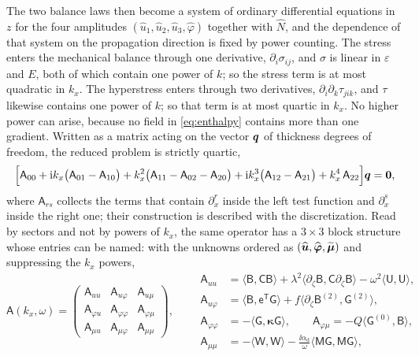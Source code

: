 The two balance laws then become a system of ordinary differential equations in
$z$ for the four amplitudes $(\widehat u_1,\widehat u_2,\widehat u_3,
\widehat\varphi)$ together with $\widehat N$, and the dependence of that system
on the propagation direction is fixed by power counting.  The stress enters the
mechanical balance through one derivative, $\partial_i\sigma_{ij}$, and $\sigma$
is linear in $\varepsilon$ and $E$, both of which contain one power of $k$; so the stress term is at most quadratic in $k_x$.  The hyperstress enters
through two derivatives, $\partial_i\partial_k\tau_{jik}$, and $\tau$ likewise
contains one power of $k$; so that term is at most quartic in $k_x$.  No
higher power can arise, because no field in \eqref{eq:enthalpy} contains more than
one gradient.  Written as a matrix acting on the vector $\boldsymbol{q}$ of thickness
degrees of freedom, the reduced problem is strictly quartic,
\begin{equation}
\label{eq:quartic}
\Bigl[\mathsf A_{00}
+\mathrm{i} k_x\bigl(\mathsf A_{01}-\mathsf A_{10}\bigr)
+k_x^{2}\bigl(\mathsf A_{11}-\mathsf A_{02}-\mathsf A_{20}\bigr)
+\mathrm{i} k_x^{3}\bigl(\mathsf A_{12}-\mathsf A_{21}\bigr)
+k_x^{4}\,\mathsf A_{22}\Bigr]\boldsymbol{q}=\boldsymbol{0} ,
\end{equation}
where $\mathsf A_{rs}$ collects the terms that contain $\partial_x^{r}$ inside the
left test function and $\partial_x^{s}$ inside the right one; their construction
is described with the discretization.  Read by sectors and not by powers of $k_x$, the same operator has a
$3\times3$ block structure whose entries can be named: with the unknowns ordered
as $(\widehat{\boldsymbol{u}},\widehat{\boldsymbol\varphi},\widetilde{\boldsymbol\mu})$
and suppressing the $k_x$ powers,
\begin{equation}
\label{eq:sector_blocks}
\mathsf A(k_x,\omega)=
\begin{pmatrix}
\mathsf A_{uu} & \mathsf A_{u\varphi} & \mathsf A_{u\mu}\\[2pt]
\mathsf A_{\varphi u} & \mathsf A_{\varphi\varphi} & \mathsf A_{\varphi\mu}\\[2pt]
\mathsf A_{\mu u} & \mathsf A_{\mu\varphi} & \mathsf A_{\mu\mu}
\end{pmatrix},
\qquad
\begin{aligned}
\mathsf A_{uu}&=\langle\mathsf B,\mathsf C\mathsf B\rangle
+\lambda^{2}\langle\partial_\zeta\mathsf B,\mathsf C\partial_\zeta\mathsf B\rangle
-\omega^{2}\langle\mathsf U,\mathsf U\rangle,\\
\mathsf A_{u\varphi}&=\langle\mathsf B,\mathsf e^{\mathsf T}\mathsf G\rangle
+f\langle\partial_\zeta\mathsf B^{(2)},\mathsf G^{(2)}\rangle,\\
\mathsf A_{\varphi\varphi}&=-\langle\mathsf G,\boldsymbol\kappa\mathsf G\rangle,\qquad
\mathsf A_{\varphi\mu}=-Q\langle\mathsf G^{(0)},\mathsf B\rangle,\\
\mathsf A_{\mu\mu}&=-\langle\mathsf W,\mathsf W\rangle
-\frac{\ii\alpha_{\mathrm d}}{\omega}\langle\mathsf M\mathsf G,\mathsf M\mathsf G\rangle,
\end{aligned}
\end{equation}
